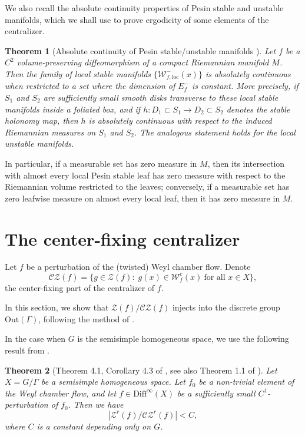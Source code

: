 \documentclass[11pt]{amsart}
\numberwithin{equation}{section}
\newcommand{\W}{\mathcal{W}}
\newcommand{\CZ}{\mathcal{CZ}}
\theoremstyle{plain}
\newtheorem{thm}{Theorem}[section]
\begin{document}

We also recall the absolute continuity properties of Pesin stable and unstable manifolds, which we shall use to prove ergodicity of some elements of the centralizer.


\begin{thm}[Absolute continuity of Pesin stable/unstable manifolds
{\cite{Pes}}]\label{pesabcont}
Let $f$ be a $C^2$ volume-preserving diffeomorphism of a compact
Riemannian manifold $M$. Then the family of local stable manifolds
$\{\mathcal W^-_{f,\mathrm{loc}}(x)\}$ is absolutely continuous when restricted to a set where the dimension of
$E^-_f$ is constant.
More precisely, if $S_1$ and $S_2$ are sufficiently small smooth disks
transverse to these local stable manifolds inside a foliated box, and
if $h:D_1\subset S_1\to D_2\subset S_2$ denotes the stable holonomy map,
then $h$ is absolutely continuous with respect to the induced
Riemannian measures on $S_1$ and $S_2$. The analogous statement holds
for the local unstable manifolds.
\end{thm}

In particular, if a measurable set has zero measure in $M$, then its intersection
with almost every local Pesin stable leaf has zero measure with respect to the Riemannian volume restricted to the leaves; conversely, if
a measurable set has zero leafwise measure on almost every local leaf,
then it has zero measure in $M$.




\section{The center-fixing centralizer}\label{sec:czf=zf}


Let $f$ be a perturbation of the (twisted) Weyl chamber flow. Denote
\[
\CZ(f)=\{g\in \mathcal Z(f):\; g(x)\in \W^c_f(x)\ \text{for all }x\in X\},
\]
the center-fixing part of the centralizer of $f$.

In this section, we show that $\mathcal Z(f)/\CZ(f)$ injects into the discrete group $\mathrm{Out}(\Gamma)$, following the method of
\cite{Witte}.

In the case when $G$ is the semisimple homogeneous space, we use the following result from \cite{Wang}.

\begin{thm}[Theorem 4.1, Corollary 4.3 of \cite{Wang}, see also Theorem 1.1 of \cite{Witte}]
    Let $X=G/\Gamma$ be a semisimple homogeneous space. Let $f_0$ be a non-trivial element of the Weyl chamber flow, and let $f\in \mathrm{Diff}^\infty(X)$ be a sufficiently small $C^1$-perturbation of $f_0$. Then we have
$$|\mathcal{Z}^r(f)/\CZ^r(f)|<C,$$
where $C$ is a constant depending only on $G$.
\end{thm}
\end{document}
